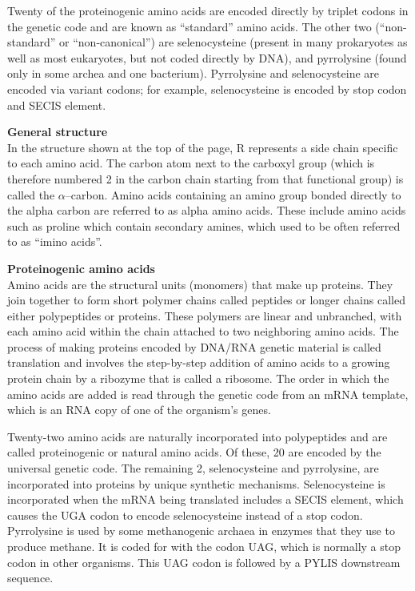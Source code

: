 Twenty of the proteinogenic amino acids are encoded directly by triplet codons in the genetic code and are known as ``standard'' amino acids. The other two (``non-standard'' or ``non-canonical'') are selenocysteine (present in many prokaryotes as well as most eukaryotes, but not coded directly by DNA), and pyrrolysine (found only in some archea and one bacterium). Pyrrolysine and selenocysteine are encoded via variant codons; for example, selenocysteine is encoded by stop codon and SECIS element.

\textbf{General structure}\\
In the structure shown at the top of the page, R represents a side chain specific to each amino acid. The carbon atom next to the carboxyl group (which is therefore numbered 2 in the carbon chain starting from that functional group) is called the $\alpha$--carbon. Amino acids containing an amino group bonded directly to the alpha carbon are referred to as alpha amino acids. These include amino acids such as proline which contain secondary amines, which used to be often referred to as ``imino acids''.

\textbf{Proteinogenic amino acids}\\
Amino acids are the structural units (monomers) that make up proteins. They join together to form short polymer chains called peptides or longer chains called either polypeptides or proteins. These polymers are linear and unbranched, with each amino acid within the chain attached to two neighboring amino acids. The process of making proteins encoded by DNA/RNA genetic material is called translation and involves the step-by-step addition of amino acids to a growing protein chain by a ribozyme that is called a ribosome. The order in which the amino acids are added is read through the genetic code from an mRNA template, which is an RNA copy of one of the organism's genes. 

Twenty-two amino acids are naturally incorporated into polypeptides and are called proteinogenic or natural amino acids. Of these, 20 are encoded by the universal genetic code. The remaining 2, selenocysteine and pyrrolysine, are incorporated into proteins by unique synthetic mechanisms. Selenocysteine is incorporated when the mRNA being translated includes a SECIS element, which causes the UGA codon to encode selenocysteine instead of a stop codon. Pyrrolysine is used by some methanogenic archaea in enzymes that they use to produce methane. It is coded for with the codon UAG, which is normally a stop codon in other organisms. This UAG codon is followed by a PYLIS downstream sequence.

